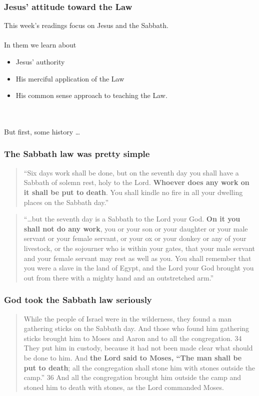 
\begin{frame}
\frametitle{Jesus' attitude toward the Law}
This week's readings focus on Jesus and the Sabbath.\\~\\
In them we learn about 
\begin{itemize}
\item Jesus' authority 
\item His merciful application of the Law
\item His common sense approach to teaching the Law.
\end{itemize}
~\\~\\
But first, some history \dots\\

\end{frame}

\begin{frame}
\frametitle{The Sabbath law was pretty simple}
\begin{quote}
``Six days work shall be done, but on the seventh day you shall have a Sabbath of solemn rest, holy to the Lord. \textbf{Whoever does any work on it shall be put to death}. You shall kindle no fire in all your dwelling places on the Sabbath day.''

\end{quote}

\begin{quote}
``\dots but the seventh day is a Sabbath to the Lord your God. \textbf{On it you shall not do any work}, you or your son or your daughter or your male servant or your female servant, or your ox or your donkey or any of your livestock, or the sojourner who is within your gates, that your male servant and your female servant may rest as well as you. You shall remember that you were a slave in the land of Egypt, and the Lord your God brought you out from there with a mighty hand and an outstretched arm.''

\end{quote}
\end{frame}

\begin{frame}
\frametitle{God took the Sabbath law seriously}
\begin{quote}
While the people of Israel were in the wilderness, they found a man gathering sticks on the Sabbath day. And those who found him gathering sticks brought him to Moses and Aaron and to all the congregation. 34 They put him in custody, because it had not been made clear what should be done to him. And \textbf{the Lord said to Moses, ``The man shall be put to death}; all the congregation shall stone him with stones outside the camp.'' 36 And all the congregation brought him outside the camp and stoned him to death with stones, as the Lord commanded Moses.

\end{quote}

\end{frame}

